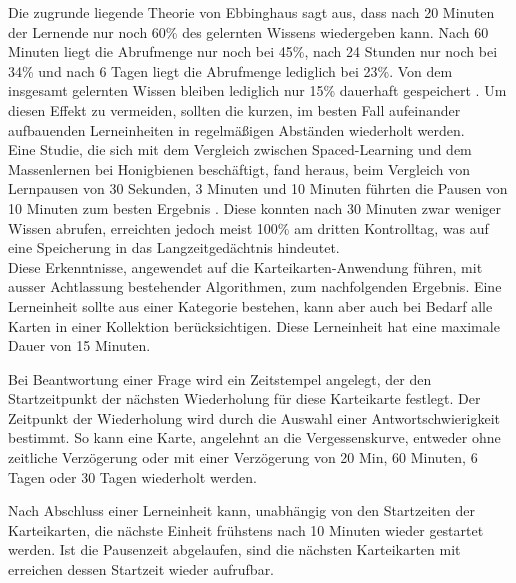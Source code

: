Die zugrunde liegende Theorie von Ebbinghaus sagt aus, dass nach 20 Minuten der Lernende nur noch 60{\%} des gelernten Wissens wiedergeben kann. Nach 60 Minuten liegt die Abrufmenge nur noch bei 45{\%}, nach 24 Stunden nur noch bei 34{\%} und nach 6 Tagen liegt die Abrufmenge lediglich bei 23{\%}. Von dem insgesamt gelernten Wissen bleiben lediglich nur 15{\%} dauerhaft gespeichert \cite{Liss.2020}. Um diesen Effekt zu vermeiden, sollten die kurzen, im besten Fall aufeinander aufbauenden Lerneinheiten in regelmäßigen Abständen wiederholt werden. \\

Eine Studie, die sich mit dem Vergleich zwischen Spaced-Learning und dem Massenlernen bei Honigbienen beschäftigt, fand heraus, beim Vergleich von Lernpausen von 30 Sekunden, 3 Minuten und 10 Minuten führten die Pausen von 10 Minuten zum besten Ergebnis \cite{Menzel.2001}. Diese konnten nach 30 Minuten zwar weniger Wissen abrufen, erreichten jedoch meist 100{\%} am dritten Kontrolltag, was auf eine Speicherung in das Langzeitgedächtnis hindeutet. \\

Diese Erkenntnisse, angewendet auf die Karteikarten-Anwendung führen, mit ausser Achtlassung bestehender Algorithmen, zum nachfolgenden Ergebnis. Eine Lerneinheit sollte aus einer Kategorie bestehen, kann aber auch bei Bedarf alle Karten in einer Kollektion berücksichtigen. Diese Lerneinheit hat eine maximale Dauer von 15 Minuten. 

Bei Beantwortung einer Frage wird ein Zeitstempel angelegt, der den Startzeitpunkt der nächsten Wiederholung für diese Karteikarte festlegt. Der Zeitpunkt der Wiederholung wird durch die Auswahl einer Antwortschwierigkeit bestimmt. So kann eine Karte, angelehnt an die Vergessenskurve, entweder ohne zeitliche Verzögerung oder mit einer Verzögerung von 20 Min, 60 Minuten, 6 Tagen oder 30 Tagen wiederholt werden. 

Nach Abschluss einer Lerneinheit kann, unabhängig von den Startzeiten der Karteikarten, die nächste Einheit frühstens nach 10 Minuten wieder gestartet werden. Ist die Pausenzeit abgelaufen, sind die nächsten Karteikarten mit erreichen dessen Startzeit wieder aufrufbar.



